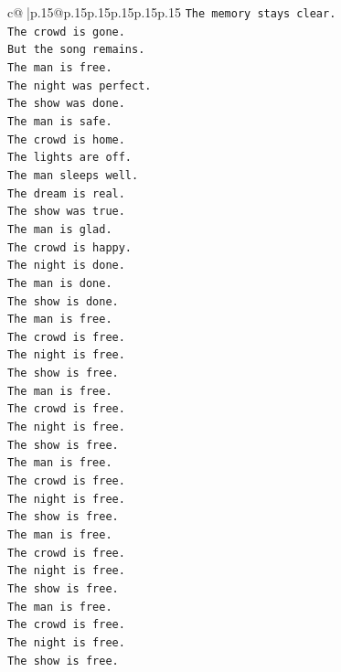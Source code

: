 \documentclass{article}
\begin{document}
{\begin{supertabular}{c@{$\;$}|p{.15\linewidth}@{}p{.15\linewidth}p{.15\linewidth}p{.15\linewidth}p{.15\linewidth}p{.15\linewidth}}
{{{\texttt{The memory stays clear.} \\
\texttt{The crowd is gone.} \\
\texttt{But the song remains.} \\
\texttt{The man is free.} \\
\texttt{The night was perfect.} \\
\texttt{The show was done.} \\
\texttt{The man is safe.} \\
\texttt{The crowd is home.} \\
\texttt{The lights are off.} \\
\texttt{The man sleeps well.} \\
\texttt{The dream is real.} \\
\texttt{The show was true.} \\
\texttt{The man is glad.} \\
\texttt{The crowd is happy.} \\
\texttt{The night is done.} \\
\texttt{The man is done.} \\
\texttt{The show is done.} \\
\texttt{The man is free.} \\
\texttt{The crowd is free.} \\
\texttt{The night is free.} \\
\texttt{The show is free.} \\
\texttt{The man is free.} \\
\texttt{The crowd is free.} \\
\texttt{The night is free.} \\
\texttt{The show is free.} \\
\texttt{The man is free.} \\
\texttt{The crowd is free.} \\
\texttt{The night is free.} \\
\texttt{The show is free.} \\
\texttt{The man is free.} \\
\texttt{The crowd is free.} \\
\texttt{The night is free.} \\
\texttt{The show is free.} \\
\texttt{The man is free.} \\
\texttt{The crowd is free.} \\
\texttt{The night is free.} \\
\texttt{The show is free.} \\
}}}
\end{supertabular}}
\end{document}
